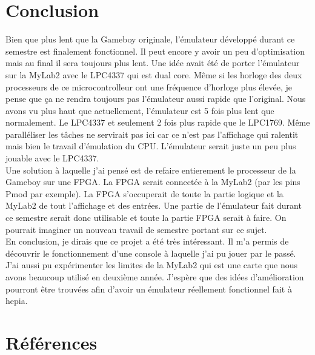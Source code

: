 \documentclass[a4paper]{article}
\begin{document}
\newpage


\section{Conclusion}
Bien que plus lent que la Gameboy originale, l'émulateur développé durant ce
semestre est finalement fonctionnel. Il peut encore y avoir un peu d'optimisation
mais au final il sera toujours plus lent. Une idée avait été de porter l'émulateur
sur la MyLab2 avec le LPC4337 qui est dual core. Même si les horloge des deux
processeurs de ce microcontrolleur ont une fréquence d'horloge plus élevée,
je pense que ça ne rendra toujours pas l'émulateur aussi rapide que l'original.
Nous avons vu plus haut que actuellement, l'émulateur est 5 fois plus lent que
normalement. Le LPC4337 et seulement 2 fois plus rapide que le LPC1769. Même
paralléliser les tâches ne servirait pas ici car ce n'est pas l'affichage qui
ralentit mais bien le travail d'émulation du CPU. L'émulateur serait juste
un peu plus jouable avec le LPC4337. \\

Une solution à laquelle j'ai pensé est de refaire entierement le processeur
de la Gameboy sur une FPGA. La FPGA serait connectée à la MyLab2 (par les pins
Pmod par exemple). La FPGA s'occuperait de toute la partie logique et la MyLab2
de tout l'affichage et des entrées. Une partie de l'émulateur fait durant ce 
semestre serait donc utilisable et toute la partie FPGA serait à faire. On pourrait
imaginer un nouveau travail de semestre portant sur ce sujet. \\

En conclusion, je dirais que ce projet a été très intéressant. Il m'a permis de
découvrir le fonctionnement d'une console à laquelle j'ai pu jouer par le passé.
J'ai aussi pu expérimenter les limites de la MyLab2 qui est une carte que nous
avons beaucoup utilisé en deuxième année. J'espère que des idées d'amélioration
pourront être trouvées afin d'avoir un émulateur réellement fonctionnel fait à hepia.

\newpage


\section{Références}
\nocite{*}


\end{document}
